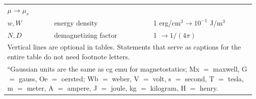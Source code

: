 \documentclass[journal,twoside,web]{ieeecolor}
\begin{document}
\begin{table}
\begin{tabular}{|p{25pt}|p{75pt}|p{115pt}|}
        $\mu \to \mu_{r}$ \\
        $w, W$& 
        energy density& 
        1 erg/cm$^{3} \to  10^{-1}$ J/m$^{3}$ \\
        $N, D$& 
        demagnetizing factor& 
        1 $\to  1/(4\pi )$ \\
        \hline
        \multicolumn{3}{p{251pt}}{Vertical lines are optional in tables. Statements that serve as captions for 
        the entire table do not need footnote letters. }\\
        \multicolumn{3}{p{251pt}}{$^{\mathrm{a}}$Gaussian units are the same as cg emu for magnetostatics; Mx 
        $=$ maxwell, G $=$ gauss, Oe $=$ oersted; Wb $=$ weber, V $=$ volt, s $=$ 
        second, T $=$ tesla, m $=$ meter, A $=$ ampere, J $=$ joule, kg $=$ 
        kilogram, H $=$ henry.}
    \end{tabular}
    \label{tab:tab1}
\end{table}
\end{document}
